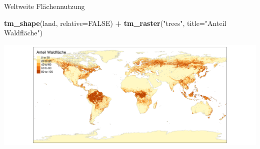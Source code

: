 \documentclass[ignorenonframetext,]{beamer}
\newenvironment{Shaded}{\begin{snugshade}}{\end{snugshade}}
\newcommand{\KeywordTok}[1]{\textcolor[rgb]{0.13,0.29,0.53}{\textbf{#1}}}
\newcommand{\DataTypeTok}[1]{\textcolor[rgb]{0.13,0.29,0.53}{#1}}
\newcommand{\StringTok}[1]{\textcolor[rgb]{0.31,0.60,0.02}{#1}}
\newcommand{\OtherTok}[1]{\textcolor[rgb]{0.56,0.35,0.01}{#1}}
\newcommand{\OperatorTok}[1]{\textcolor[rgb]{0.81,0.36,0.00}{\textbf{#1}}}
\newcommand{\NormalTok}[1]{#1}
\begin{document}
\begin{frame}[fragile]{Weltweite Flächennutzung}

\begin{Shaded}
\begin{Highlighting}[]
\KeywordTok{tm_shape}\NormalTok{(land,  }\DataTypeTok{relative=}\OtherTok{FALSE}\NormalTok{) }\OperatorTok{+}
\StringTok{    }\KeywordTok{tm_raster}\NormalTok{(}\StringTok{"trees"}\NormalTok{, }\DataTypeTok{title=}\StringTok{"Anteil Waldfläche"}\NormalTok{)}
\end{Highlighting}
\end{Shaded}

\includegraphics{slides_all2gether_part1_files/figure-beamer/unnamed-chunk-86-1.pdf}

\end{frame}
\end{document}
